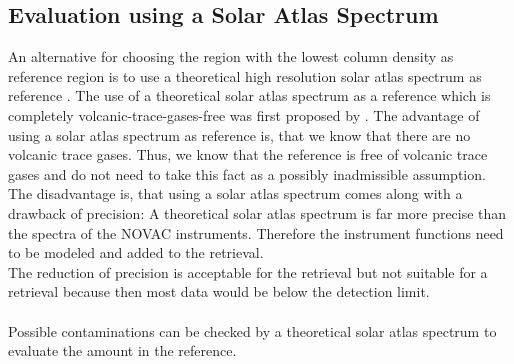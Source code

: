 \subsection*{Evaluation using a Solar Atlas Spectrum \label{kuruz}}
An alternative for choosing the region with the lowest column density as reference region is to use a theoretical high resolution solar atlas spectrum as reference \cite{chance2010improved}.
The use of a theoretical solar atlas spectrum as a reference which is completely volcanic-trace-gases-free was first proposed by \cite{lubcke2014bro}.
The advantage of using a solar atlas spectrum as reference is, that we know that there are no volcanic trace gases. Thus, we know that the reference is free of volcanic trace gases and do not need to take this fact as a possibly inadmissible assumption. The disadvantage is, that using a solar atlas spectrum comes along with a drawback of precision: A theoretical solar atlas spectrum is far more precise than the spectra of the NOVAC instruments. Therefore the instrument functions need to be modeled and added to the retrieval.\\ 
The reduction of precision is acceptable for the
 retrieval but not suitable for a  retrieval because then most data would be below the detection limit.\\
%
\\
%
Possible contaminations can be checked
by a theoretical solar atlas spectrum to evaluate the  amount in the reference.
%
